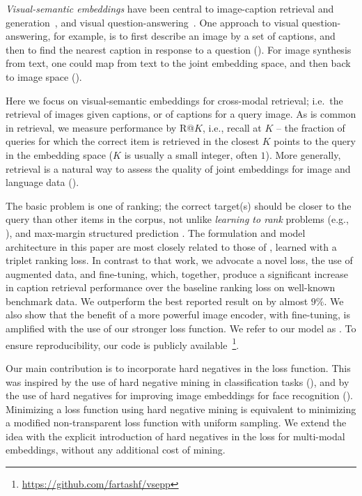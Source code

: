 {\em Visual-semantic embeddings} have been central to
image-caption retrieval and 
generation~\cite{kiros2014unifying,karpathy2015deep}, and visual 
question-answering~\cite{Malinowski15}.  One approach to visual 
question-answering, for example, is to first describe an image by a set of 
captions, and then to find the nearest caption in response to a question 
(\cite{agrawal2017vqa,zitnick2016measuring}). For image synthesis 
from text, one could map from text to the joint embedding space, and then
back to image space (\cite{reed2016generative,reed2016learning}).

Here we focus on visual-semantic embeddings for cross-modal retrieval; 
i.e.\ the retrieval of images given captions, 
or of captions for a query image.  As is common in retrieval, 
we measure performance by R@$K$, i.e., recall at $K$ -- the fraction of 
queries for which the correct item is retrieved in the closest $K$ points 
to the query in the embedding space ($K$ is usually a small integer, 
often $1$).  More generally, retrieval is a natural way to assess the 
quality of joint embeddings for image and language data (\cite{hodosh2013framing}).

The basic problem is one of ranking; the correct target(s) 
should be closer to the query than other items in the corpus, not unlike
{\em learning to rank}\/ problems (e.g., \cite{li2014learning}), and 
max-margin structured prediction \cite{chapelle2007large,le2007direct}.
The formulation and model architecture in this paper are most closely 
related to those of \cite{kiros2014unifying}, learned with a triplet ranking 
loss.  In contrast to that work, we advocate a novel loss, the use of 
augmented data, and fine-tuning, which, together, produce a significant 
increase in caption retrieval performance over the baseline ranking loss on 
well-known benchmark data.  We outperform the best reported result on 
\coco{} by almost $9\%$.  We also show that the benefit of a more 
powerful image encoder, with fine-tuning, is amplified with 
the use of our stronger loss function.
We refer to our model as \VSEpp{}.
To ensure reproducibility, our code is publicly 
available~\footnote{\url{https://github.com/fartashf/vsepp}}.

Our main contribution is to incorporate hard negatives in the loss 
function.  This was inspired by the use of hard negative mining in 
classification tasks (\cite{dalal2005histograms, 
felzenszwalb2010object, malisiewicz2011ensemble}), and by the use of
hard negatives for improving image embeddings for face recognition 
(\cite{schroff2015facenet, wu2017sampling}). Minimizing a loss function using 
hard negative mining is equivalent to minimizing a modified non-transparent 
loss function with uniform sampling.  We extend the idea with the explicit 
introduction of hard negatives in the loss for multi-modal embeddings, 
without any additional cost of mining.


